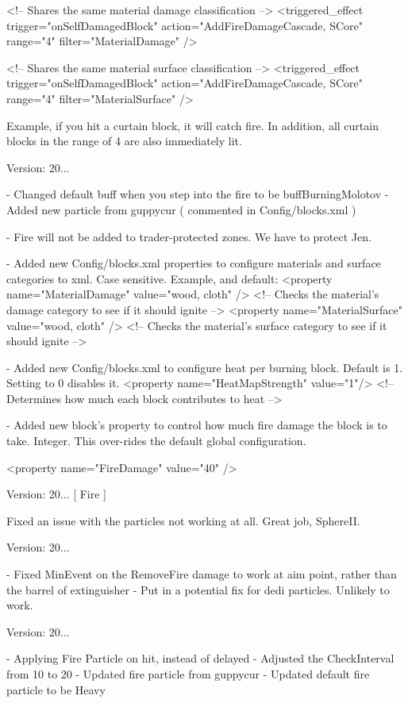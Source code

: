 \begin{DoxyVerb}[ Fire ]
            <!-- Shares the same material damage classification -->
            <triggered_effect trigger="onSelfDamagedBlock" action="AddFireDamageCascade, SCore" range="4" filter="MaterialDamage" />

            <!-- Shares the same material surface classification -->
            <triggered_effect trigger="onSelfDamagedBlock" action="AddFireDamageCascade, SCore" range="4" filter="MaterialSurface" />

        Example, if you hit a curtain block, it will catch fire. In addition, all curtain blocks in the range of 4 are also immediately lit.
\end{DoxyVerb}


Version\+: 20... \begin{DoxyVerb}[ Fire ]
    - Changed default buff when you step into the fire to be buffBurningMolotov 
    - Added new particle from guppycur ( commented in Config/blocks.xml )

    - Fire will not be added to trader-protected zones. We have to protect Jen.

    - Added new Config/blocks.xml properties to configure materials and surface categories to xml. Case sensitive.
        Example, and default:
            <property name="MaterialDamage" value="wood, cloth" /> <!-- Checks the material's damage category to see if it should ignite  -->
            <property name="MaterialSurface" value="wood, cloth" /> <!-- Checks the material's surface category to see if it should ignite -->

    - Added new Config/blocks.xml to configure heat per burning block. Default is 1. Setting to 0 disables it.
        <property name="HeatMapStrength" value="1"/>            <!-- Determines how much each block contributes to heat -->

    - Added new block's property to control how much fire damage the block is to take. Integer.
        This over-rides the default global configuration.

        <property name="FireDamage" value="40" />
\end{DoxyVerb}


Version\+: 20... \mbox{[} Fire \mbox{]}
\begin{DoxyItemize}
\item Fixed an issue with the particles not working at all. Great job, Sphere\+II.
\end{DoxyItemize}

Version\+: 20... \begin{DoxyVerb}[ Fire ]
    - Fixed MinEvent on the RemoveFire damage to work at aim point, rather than the barrel of extinguisher
    - Put in a potential fix for dedi particles. Unlikely to work.
\end{DoxyVerb}
 Version\+: 20... \begin{DoxyVerb}
    - Applying Fire Particle on hit, instead of delayed
    - Adjusted the CheckInterval from 10 to 20
    - Updated fire particle from guppycur
    - Updated default fire particle to be Heavy
\end{DoxyVerb}


